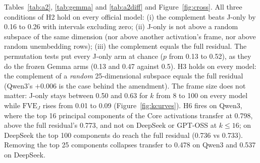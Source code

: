 \documentclass[11pt,a4paper]{article}
\begin{document}
\begin{table}[t]
\centering
\caption{A2 paired differences at $k=25$, bootstrap over the same episodes (Gemma: the frozen contrasts of Table~\ref{tab:gemma}).}
\label{tab:a2diff}
\footnotesize
\setlength{\tabcolsep}{3pt}
\end{table}

Tables~\ref{tab:a2}, \ref{tab:gemma} and \ref{tab:a2diff} and Figure~\ref{fig:cross}. All three conditions of H2 hold on every official model: (i) the complement beats J-only by 0.16 to 0.26 with intervals excluding zero; (ii) J-only is not above a random subspace of the same dimension (nor above another activation's frame, nor above random unembedding rows); (iii) the complement equals the full residual. The permutation tests put every J-only arm at chance ($p$ from 0.13 to 0.52), as they do the frozen Gemma arms (0.13 and 0.47 against 0.5). H3 holds on every model: the complement of a \emph{random} 25-dimensional subspace equals the full residual (Qwen3's $+0.006$ is the case behind the amendment). The frame size does not matter: J-only stays between 0.50 and 0.63 for $k$ from 8 to 100 on every model while $\mathrm{FVE}_J$ rises from 0.01 to 0.09 (Figure~\ref{fig:kcurves}). H6 fires on Qwen3, where the top 16 principal components of the Core activations transfer at 0.798, above the full residual's 0.773, and not on DeepSeek or GPT-OSS at $k\le16$; on DeepSeek the top 100 components do reach the full residual (0.736 vs 0.733). Removing the top 25 components collapses transfer to 0.478 on Qwen3 and 0.537 on DeepSeek.
\end{document}

